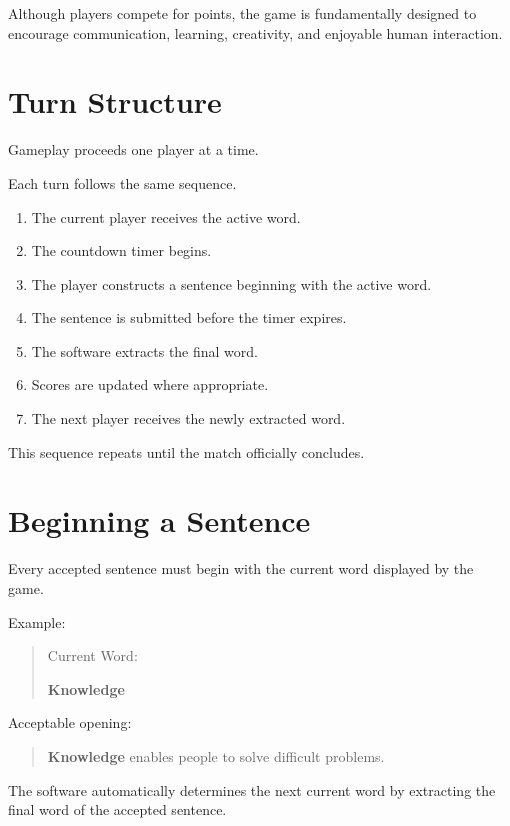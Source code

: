 \documentclass[11pt,a4paper]{article}
\begin{document}
Although players compete for points, the game is fundamentally designed to encourage communication, learning, creativity, and enjoyable human interaction.

\section{Turn Structure}

Gameplay proceeds one player at a time.

Each turn follows the same sequence.

\begin{enumerate}
    \item The current player receives the active word.
    \item The countdown timer begins.
    \item The player constructs a sentence beginning with the active word.
    \item The sentence is submitted before the timer expires.
    \item The software extracts the final word.
    \item Scores are updated where appropriate.
    \item The next player receives the newly extracted word.
\end{enumerate}

This sequence repeats until the match officially concludes.

\section{Beginning a Sentence}

Every accepted sentence must begin with the current word displayed by the game.

Example:

\begin{quote}
Current Word:

\textbf{Knowledge}
\end{quote}

Acceptable opening:

\begin{quote}
\textbf{Knowledge} enables people to solve difficult problems.
\end{quote}

The software automatically determines the next current word by extracting the final word of the accepted sentence.
\end{document}
